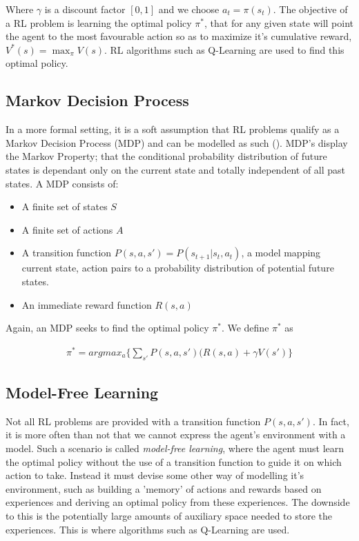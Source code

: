 Where $\gamma$ is a discount factor $[0, 1]$ and we choose $a_t = \pi(s_t)$. The objective of a RL
problem is learning the optimal policy $\pi^*$, that for any given state will point the agent to the
most favourable action so as to maximize it's cumulative reward, $V^*(s) = \max_{\pi}V(s)$. RL
algorithms such as Q-Learning are used to find this optimal policy. \paragraph{}

\subsection{Markov Decision Process}
In a more formal setting, it is a soft assumption that RL problems qualify as a Markov Decision
Process (MDP) and can be modelled as such (\citet{survey-drl}). MDP's display the Markov Property; that
the conditional probability distribution of future states is dependant only on the current state and
totally independent of all past states. A MDP consists of:

\begin{itemize}
    \item A finite set of states $S$
    \item A finite set of actions $A$
    \item A transition function $P(s, a, s') = P(s_{t+1}|s_t, a_t)$, a model mapping current state,
          action pairs to a probability distribution of potential future states.
    \item An immediate reward function $R(s, a)$
\end{itemize}

Again, an MDP seeks to find the optimal policy $\pi^*$. We define $\pi^*$ as

\begin{align}
    \pi^* = argmax_a\{\sum_{s'}P(s, a, s')(R(s, a) + \gamma V(s')\}
\end{align}

\subsection{Model-Free Learning}
Not all RL problems are provided with a transition function $P(s, a, s')$. In fact, it is more often
than not that we cannot express the agent's environment with a model. Such a scenario is called
\textit{model-free learning}, where the agent must learn the optimal policy without the use of a
transition function to guide it on which action to take. Instead it must devise some other way of
modelling it's environment, such as building a 'memory' of actions and rewards based on experiences
and deriving an optimal policy from these experiences. The downside to this is the potentially large
amounts of auxiliary space needed to store the experiences. This is where algorithms such as
Q-Learning are used. \paragraph{}


